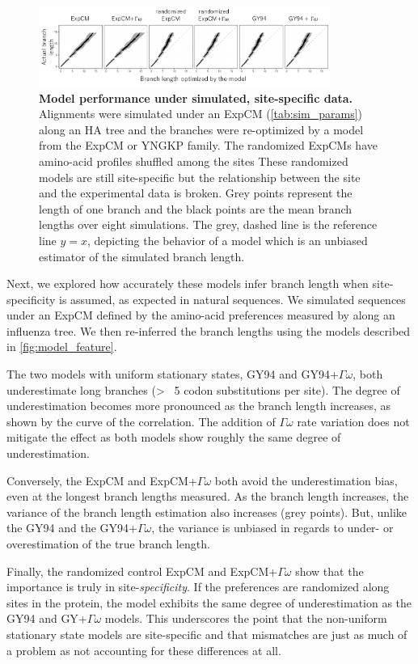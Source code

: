 \documentclass[11pt]{article}
\begin{document}
\begin{figure}[H]
\centerline{\includegraphics[width=0.85\textwidth]{figures/simulations}}
\caption{\label{simulations}
\textbf{Model performance under simulated, site-specific data.} 
Alignments were simulated under an ExpCM (\ref{tab:sim_params}) along an HA tree and the branches were re-optimized by a model from the ExpCM or YNGKP family. 
The randomized ExpCMs have amino-acid profiles shuffled among the sites 
These randomized models are still site-specific but the relationship between the site and the experimental data is broken. 
Grey points represent the length of one branch and the black points are the mean branch lengths over eight simulations. 
The grey, dashed line is the reference line $y=x$, depicting the behavior of a model which is an unbiased estimator of the simulated branch length. 
}
\end{figure}

Next, we explored how accurately these models infer branch length when site-specificity is assumed, as expected in natural sequences.  
We simulated sequences under an ExpCM defined by the amino-acid preferences measured by \cite{doud2016accurate} along an influenza tree. 
We then re-inferred the branch lengths using the models described in \ref{fig:model_feature}. 

The two models with uniform stationary states, GY94 and GY94+$\Gamma\omega$, both underestimate long branches (> ~5 codon substitutions per site). 
The degree of underestimation becomes more pronounced as the branch length increases, as shown by the curve of the correlation. 
The addition of $\Gamma\omega$ rate variation does not mitigate the effect as both models show roughly the same degree of underestimation. 

Conversely, the ExpCM and ExpCM+$\Gamma\omega$ both avoid the underestimation bias, even at the longest branch lengths measured. 
As the branch length increases, the variance of the branch length estimation also increases (grey points). 
But, unlike the GY94 and the GY94+$\Gamma\omega$, the variance is unbiased in regards to under- or overestimation of the true branch length. 

Finally, the randomized control ExpCM and ExpCM+$\Gamma\omega$ show that the importance is truly in site-\textit{specificity}. 
If the preferences are randomized along sites in the protein, the model exhibits the same degree of underestimation as the GY94 and GY+$\Gamma\omega$ models. 
This underscores the point that the non-uniform stationary state models are site-specific and that mismatches are just as much of a problem as not accounting for these differences at all. 
\end{document}
